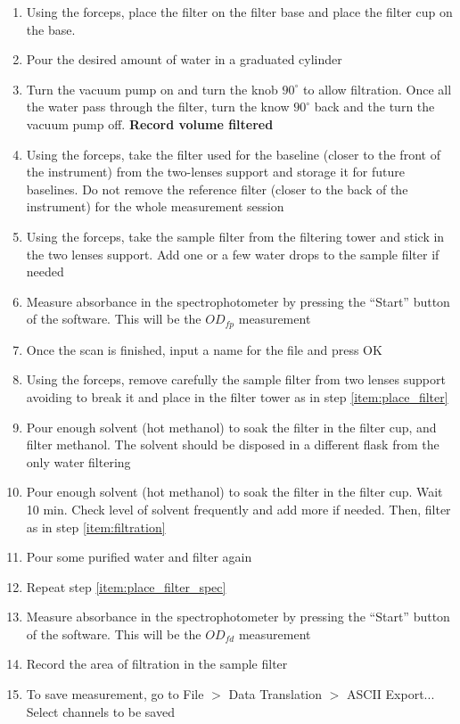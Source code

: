 \begin{appendices}
\begin{enumerate}[itemsep=2pt,parsep=2pt]
  \item \label{item:place_filter} Using the forceps, place the filter on the filter base and place the filter cup on the base. 
  \item Pour the desired amount of water in a graduated cylinder
  \item \label{item:filtration} Turn the vacuum pump on and turn the knob $90^\circ$ to allow filtration. Once all the water pass through the filter, turn the know $90^\circ$ back and the turn the vacuum pump off. \textbf{Record volume filtered}
  \item Using the forceps, take the filter used for the baseline (closer to the front of the instrument) from the two-lenses support and storage it for future baselines. Do not remove the reference filter (closer to the back of the instrument) for the whole measurement session
  \item \label{item:place_filter_spec} Using the forceps, take the sample filter from the filtering tower and stick in the two lenses support. Add one or a few water drops to the sample filter if needed 
  \item  Measure absorbance in the spectrophotometer by pressing the ``Start'' button of the software. This will be the $OD_{fp}$ measurement
  \item Once the scan is finished, input a name for the file and press OK
  \item Using the forceps, remove carefully the sample filter from two lenses support avoiding to break it and place in the filter tower as in step \ref{item:place_filter}
  \item Pour enough solvent (hot methanol) to soak the filter in the filter cup, and filter methanol. The solvent should be disposed in a different flask from the only water filtering
  \item Pour enough solvent (hot methanol) to soak the filter in the filter cup.  Wait 10 min. Check level of solvent frequently and add more if needed. Then, filter as in step \ref{item:filtration}
  \item Pour some purified water and filter again
  \item Repeat step \ref{item:place_filter_spec}
  \item Measure absorbance in the spectrophotometer by pressing the ``Start'' button of the software. This will be the $OD_{fd}$ measurement 
  \item Record the area of filtration in the sample filter
  \item To save measurement, go to File $>$ Data Translation $>$ ASCII Export...  Select channels to be saved
\end{enumerate}


\end{appendices}
